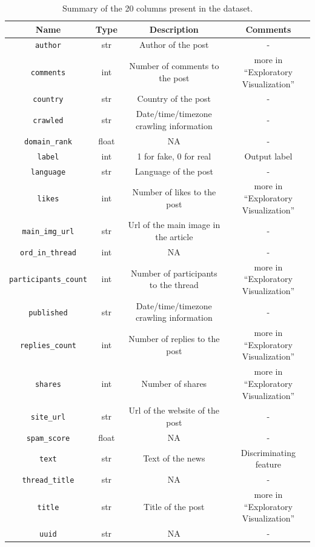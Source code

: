 \documentclass[a4paper,12pt]{article} %
\begin{document}
\begin{table}
\footnotesize
\begin{center}
\begin{tabular}{ c | c | c | c }
\textbf{Name} & \textbf{Type} & \textbf{Description} & \textbf{Comments} \\ \hline
\texttt{author} & str & Author of the post & - \\ \hline
\texttt{comments} & int & Number of comments to the post & more in ``Exploratory Visualization'' \\ \hline
\texttt{country} & str & Country of the post & - \\ \hline
\texttt{crawled} & str & Date/time/timezone crawling information & - \\ \hline
\texttt{domain\_rank} & float & NA & - \\ \hline
\texttt{label} & int & 1 for fake, 0 for real & Output label \\ \hline
\texttt{language} & str & Language of the post & - \\ \hline
\texttt{likes} & int & Number of likes to the post & more in ``Exploratory Visualization'' \\ \hline
\texttt{main\_img\_url} & str & Url of the main image in the article & - \\ \hline
\texttt{ord\_in\_thread} & int & NA & - \\ \hline
\texttt{participants\_count} & int & Number of participants to the thread & more in ``Exploratory Visualization'' \\ \hline
\texttt{published} & str & Date/time/timezone crawling information & - \\ \hline
\texttt{replies\_count} & int & Number of replies to the post & more in ``Exploratory Visualization'' \\ \hline
\texttt{shares} & int & Number of shares & more in ``Exploratory Visualization'' \\ \hline
\texttt{site\_url} & str & Url of the website of the post & - \\ \hline
\texttt{spam\_score} & float & NA & - \\ \hline
\texttt{text} & str & Text of the news & Discriminating feature \\ \hline
\texttt{thread\_title} & str & NA & - \\ \hline
\texttt{title} & str & Title of the post & more in ``Exploratory Visualization'' \\ \hline
\texttt{uuid} & str & NA & - \\
\end{tabular}
\end{center}
\caption{Summary of the 20 columns present in the dataset. \label{tab:columns}}
\end{table}
\end{document}
